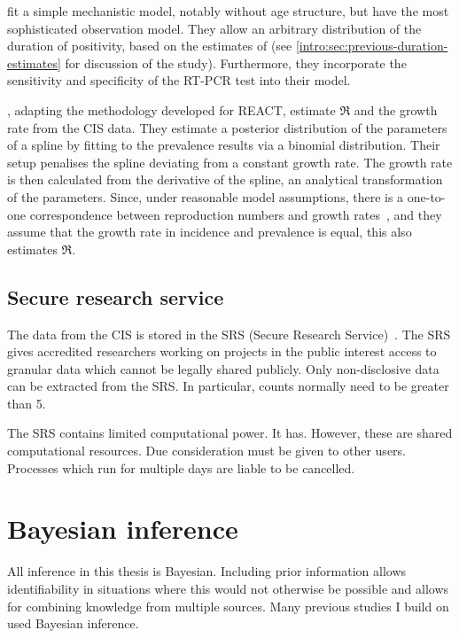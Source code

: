 \documentclass[thesis.tex]{subfiles}
\begin{document}
\Textcite{nicholsonImproving} fit a simple mechanistic model, notably without age structure, but have the most sophisticated observation model.
They allow an arbitrary distribution of the duration of positivity, based on the estimates of \textcite{hellewellPCRSensitivity} (see \cref{intro:sec:previous-duration-estimates} for discussion of the \textcite{hellewellPCRSensitivity} study).
Furthermore, they incorporate the sensitivity and specificity of the RT-PCR test into their model.

\Textcite{mccabeCISincidence}, adapting the methodology \textcite{ealesAppropriately} developed for REACT, estimate $\Re$ and the growth rate from the CIS data.
They estimate a posterior distribution of the parameters of a spline by fitting to the prevalence results via a binomial distribution.
Their setup penalises the spline deviating from a constant growth rate.
The growth rate is then calculated from the derivative of the spline, an analytical transformation of the parameters.
Since, under reasonable model assumptions, there is a one-to-one correspondence between reproduction numbers and growth rates~\autocite{wallingaGI}, and they assume that the growth rate in incidence and prevalence is equal, this also estimates $\Re$.

\subsection{Secure research service}

The data from the CIS is stored in the SRS (Secure Research Service)~\autocite{onsSRS}.
The SRS gives accredited researchers working on projects in the public interest access to granular data which cannot be legally shared publicly.
Only non-disclosive data can be extracted from the SRS.
In particular, counts normally need to be greater than 5.

The SRS contains limited computational power.
It has.
However, these are shared computational resources.
Due consideration must be given to other users.
Processes which run for multiple days are liable to be cancelled.

\section{Bayesian inference} \label{intro:sec:Bayes}

All inference in this thesis is Bayesian.
Including prior information allows identifiability in situations where this would not otherwise be possible and allows for combining knowledge from multiple sources.
Many previous studies I build on used Bayesian inference.
\end{document}
